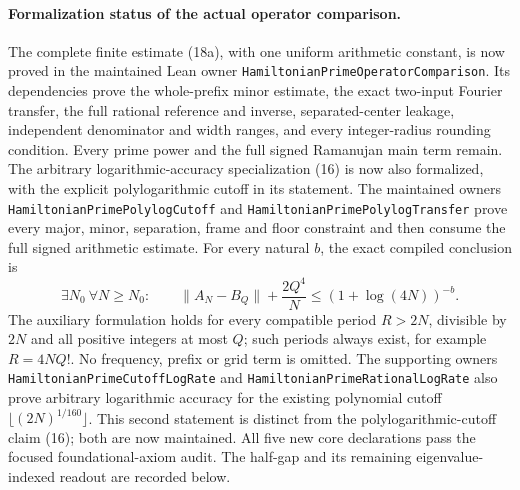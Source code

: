 \paragraph{Formalization status of the actual operator comparison.}
The complete finite estimate (18a), with one uniform arithmetic
constant, is now proved in the maintained Lean owner
\texttt{HamiltonianPrimeOperatorComparison}.
Its dependencies prove the whole-prefix minor estimate, the exact
two-input Fourier transfer, the full rational reference and inverse,
separated-center leakage, independent denominator and width ranges,
and every integer-radius rounding condition.
Every prime power and the full signed Ramanujan main term remain.
The arbitrary logarithmic-accuracy specialization (16) is now also
formalized, with the explicit polylogarithmic cutoff in its statement.
The maintained owners
\texttt{HamiltonianPrimePolylogCutoff} and
\texttt{HamiltonianPrimePolylogTransfer} prove every major, minor,
separation, frame and floor constraint and then consume the full
signed arithmetic estimate.
For every natural \(b\), the exact compiled conclusion is
\[
 \exists N_0\ \forall N\geq N_0:\qquad
 \|A_N-B_Q\|+\frac{2Q^4}{N}
       \leq (1+\log(4N))^{-b}.
\]
The auxiliary formulation holds for every compatible period
\(R>2N\), divisible by \(2N\) and all positive integers at most \(Q\);
such periods always exist, for example \(R=4NQ!\).
No frequency, prefix or grid term is omitted.
The supporting owners \texttt{HamiltonianPrimeCutoffLogRate} and
\texttt{HamiltonianPrimeRationalLogRate} also prove arbitrary
logarithmic accuracy for the existing polynomial cutoff
\(\lfloor(2N)^{1/160}\rfloor\).
This second statement is distinct from the polylogarithmic-cutoff
claim (16); both are now maintained.
All five new core declarations pass the focused foundational-axiom
audit.
The half-gap and its remaining eigenvalue-indexed readout are
recorded below.

